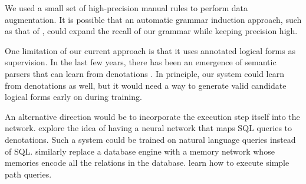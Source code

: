 \documentclass[11pt,letterpaper]{article}
\begin{document}
We used a small set of high-precision manual rules to perform data augmentation.
It is possible that an automatic grammar induction approach,
such as that of ,
could expand the recall of our grammar while keeping precision high.

One limitation of our current approach is that it 
uses annotated logical forms as supervision.
In the last few years, there has been an emergence of
semantic parsers that can learn from denotations 
\cite{clarke10world,liang11dcs,berant2013freebase,artzi2013weakly}.
In principle, our system could learn from denotations as well,
but it would need a way to generate valid candidate logical forms
early on during training.

An alternative direction would be to incorporate the execution
step itself into the network.  
explore the idea of having a neural network that maps
SQL queries to denotations.  Such a system could be trained
on natural language queries instead of SQL.
similarly replace a database engine with a memory network
whose memories encode all the relations in the database.
 learn how to execute simple path queries.





\end{document}
